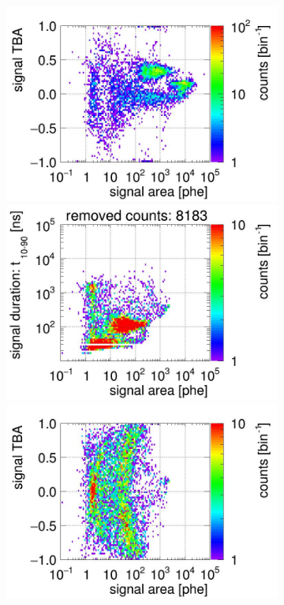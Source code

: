 \begin{landscape}
\begin{figure}[!p]
\begin{subfigure}[t]{0.33\textwidth}
		\includegraphics[width=\figurewidth,clip,trim={0 98 0 40}]{Figures/GasTest/CutsValid/res64767/tbapa05Vecfig64767.jpg}
		\includegraphics[width=\figurewidth,clip,trim={0 98 0 10}]{Figures/GasTest/CutsValid/res64767/pdpaX05Vecfig64767.jpg}
\includegraphics[width=\figurewidth,clip,trim={0 0 0 40}]{Figures/GasTest/CutsValid/res64767/tbapaX05Vecfig64767.jpg}

\end{subfigure}
\end{figure}
\end{landscape}
